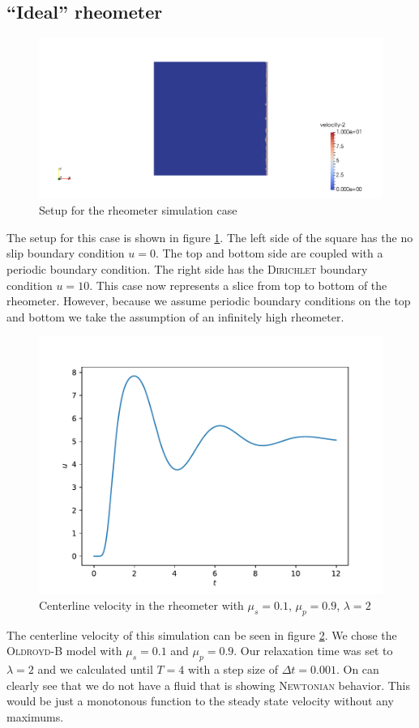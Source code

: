 \documentclass[12pt,a4paper,twoside, open=right]{scrreprt}
\theoremstyle{definition}
\theoremstyle{plain}
\begin{document}
\subsection{\enquote{Ideal} rheometer}
\begin{figure}
    \centering
    \includegraphics[width=\textwidth]{RheometerSetup}
    \caption{Setup for the rheometer simulation case}
    \label{fig:rheometersetup}
\end{figure}
The setup for this case is shown in figure \ref{fig:rheometersetup}. The left side of the square has the no slip boundary condition $u=0$. The top and bottom side are coupled with a periodic boundary condition. The right side has the \textsc{Dirichlet} boundary condition $u=10$. This case now represents a slice from top to bottom of the rheometer. However, because we assume periodic boundary conditions on the top and bottom we take the assumption of an infinitely high rheometer. 
\begin{figure}
    \centering
    \includegraphics[width=\textwidth]{RheometerCenterline}
    \caption{Centerline velocity in the rheometer with $\mu_s=0.1$, $\mu_p=0.9$, $\lambda=2$ }
    \label{fig:rheomcenter}
\end{figure} 
\par The centerline velocity of this simulation can be seen in figure \ref{fig:rheomcenter}. We chose the \textsc{Oldroyd}-B model with $\mu_s=0.1$ and $\mu_p=0.9$. Our relaxation time was set to $\lambda=2$ and we calculated until $T=4$ with a step size of $\Delta t=0.001$. On can clearly see that we do not have a fluid that is showing \textsc{Newtonian} behavior. This would be just a monotonous function to the steady state velocity without any maximums.
\end{document}
